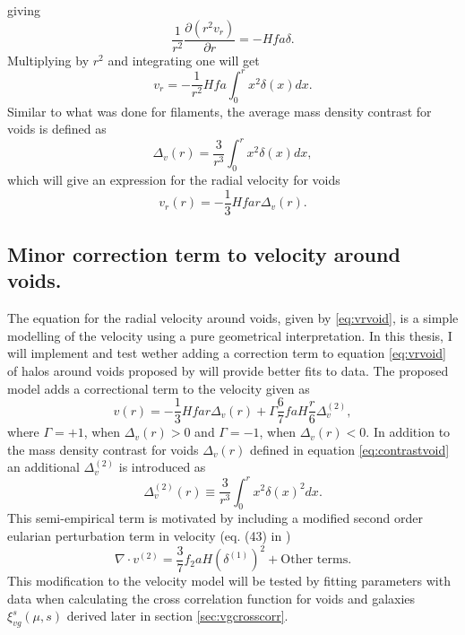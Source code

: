 giving
\begin{equation}
    \frac{1}{r^2}\frac{\partial(r^2v_r)}{\partial r}=-Hfa\delta.
\end{equation}
Multiplying by $r^2$ and integrating one will get
\begin{equation}
    v_r = -\frac{1}{r^2}Hfa\int_0^r x^2\delta(x)dx.
\end{equation}
Similar to what was done for filaments, the average mass density contrast for voids is defined as
\begin{equation}\label{eq:contrastvoid}
    \Delta_v(r)=\frac{3}{r^3}\int_0^r x^2\delta(x)dx,
\end{equation}
which will give an expression for the radial velocity for voids
\begin{equation}\label{eq:vrvoid}
    v_r(r)=-\frac{1}{3}Hfar\Delta_v(r).
\end{equation}
\subsection{Minor correction term to velocity around voids.}\label{sec:vr_correction}
The equation for the radial velocity around voids, given by \ref{eq:vrvoid}, is a simple modelling of the velocity using a pure geometrical interpretation. In this thesis, I will implement and test wether adding a correction term to equation \ref{eq:vrvoid} of halos around voids proposed by \cite{Achitouv_streaming} will provide better fits to data. The proposed model adds a correctional term to the velocity given as
\begin{equation}\label{eq:achitouv2017}
    v(r)=-\frac{1}{3}Hfar\Delta_v(r)+\Gamma\frac{6}{7}faH\frac{r}{6}\Delta_v^{(2)},
\end{equation}
where $\Gamma=+1$, when $\Delta_v(r)>0$ and $\Gamma=-1$, when $\Delta_v(r)<0$. In addition to the mass density contrast for voids $\Delta_v(r)$ defined in equation \ref{eq:contrastvoid} an additional $\Delta_v^{(2)}$ is introduced as 
\begin{equation}
    \Delta_v^{(2)}(r)\equiv\frac{3}{r^3}\int_0^rx^2\delta(x)^2dx.
\end{equation}
This semi-empirical term is motivated by including a modified second order eularian perturbation term in velocity (eq. (43) in \cite{Catelan_2ndordervelpert})
\begin{equation}
    \nabla\cdot v^{(2)}=\frac{3}{7}f_2aH(\delta^{(1)})^2+\text{Other terms}.
\end{equation}
This modification to the velocity model will be tested by fitting parameters with data when calculating the cross correlation function for voids and galaxies $\xi_{vg}^s(\mu,s)$ derived later in section \ref{sec:vgcrosscorr}.
